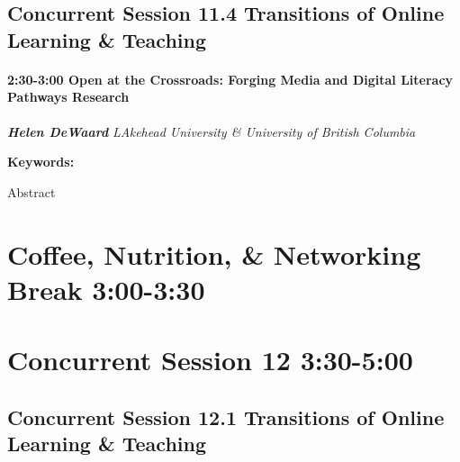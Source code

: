 \documentclass[
]{book}
\begin{document}
\hypertarget{concurrent-session-11.4-transitions-of-online-learning-teaching}{%
\subsection*{Concurrent Session 11.4 \textbar{} Transitions of Online Learning \& Teaching}\label{concurrent-session-11.4-transitions-of-online-learning-teaching}}

\begin{session}
\hypertarget{open-at-the-crossroads-forging-media-and-digital-literacy-pathways-research}{%
\paragraph*{\texorpdfstring{2:30-3:00 \textbar{} \textbf{Open at the
Crossroads: Forging Media and Digital Literacy Pathways} \textbar{}
Research}{2:30-3:00 \textbar{} Open at the Crossroads: Forging Media and Digital Literacy Pathways \textbar{} Research}}\label{open-at-the-crossroads-forging-media-and-digital-literacy-pathways-research}}

\textbf{\emph{Helen DeWaard}} \textbar{} \emph{LAkehead University \&
University of British Columbia}

\textbf{Keywords:}

Abstract
\end{session}

\hypertarget{coffee-nutrition-networking-break-300-330-2}{%
\section{Coffee, Nutrition, \& Networking Break \textbar{} 3:00-3:30}\label{coffee-nutrition-networking-break-300-330-2}}

\hypertarget{concurrent-session-12-330-500}{%
\section*{Concurrent Session 12 \textbar{} 3:30-5:00}\label{concurrent-session-12-330-500}}

\hypertarget{concurrent-session-12.1-transitions-of-online-learning-teaching}{%
\subsection*{Concurrent Session 12.1 \textbar{} Transitions of Online Learning \& Teaching}\label{concurrent-session-12.1-transitions-of-online-learning-teaching}}
\end{document}
